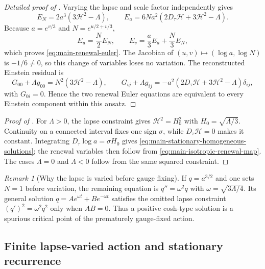 \documentclass[11pt]{article}
\theoremstyle{definition}
\theoremstyle{remark}
\newtheorem{remark}[remark]{Remark}
\begin{document}
\begin{proof}[Detailed proof of ]
Varying the lapse and scale factor independently gives
\begin{equation}
 E_N=2a^3(3\mathcal H^2-\Lambda),\qquad
 E_a=6Na^2(2D_\tau\mathcal H+3\mathcal H^2-\Lambda).
 \label{eq:supp-homogeneous-EaEN}
\end{equation}
Because
$a=e^{v/3}$ and $N=e^{u/2+v/3}$,
\[
 E_u=\frac N2E_N,\qquad
 E_v=\frac a3E_a+\frac N3E_N,
\]
which proves \eqref{eq:main-renewal-euler}.  The Jacobian of
$(u,v)\mapsto(\log a,\log N)$ is $-1/6\ne0$, so this change of
variables loses no variation.  The reconstructed Einstein residual is
\begin{equation}
 G_{00}+\Lambda g_{00}=N^2(3\mathcal H^2-\Lambda),
 \qquad
 G_{ij}+\Lambda g_{ij}
 =-a^2(2D_\tau\mathcal H+3\mathcal H^2-\Lambda)\delta_{ij},
 \label{eq:supp-homogeneous-Einstein-residual}
\end{equation}
with $G_{0i}=0$.  Hence the two renewal Euler equations are equivalent to every
Einstein component within this ansatz.
\end{proof}

\begin{proof}[Proof of ]
For $\Lambda>0$, the lapse constraint gives
$\mathcal H^2=H_0^2$ with $H_0=\sqrt{\Lambda/3}$.  Continuity on a
connected interval fixes one sign $\sigma$, while
$D_\tau\mathcal H=0$ makes it constant.  Integrating
$D_\tau\log a=\sigma H_0$ gives
\eqref{eq:main-stationary-homogeneous-solutions}; the renewal variables then
follow from \eqref{eq:main-isotropic-renewal-map}.  The cases $\Lambda=0$ and
$\Lambda<0$ follow from the same squared constraint.
\end{proof}

\begin{remark}[Why the lapse is varied before gauge fixing]
If $q=a^{3/2}$ and one sets $N=1$ before variation, the remaining equation is
$q''=\omega^2q$ with $\omega=\sqrt{3\Lambda/4}$.  Its general solution
$q=Ae^{\omega t}+Be^{-\omega t}$ satisfies the omitted lapse constraint
$(q')^2=\omega^2q^2$ only when $AB=0$.  Thus a positive cosh-type solution is a
spurious critical point of the prematurely gauge-fixed action.
\end{remark}

\subsection{Finite lapse-varied action and stationary recurrence}
\end{document}
